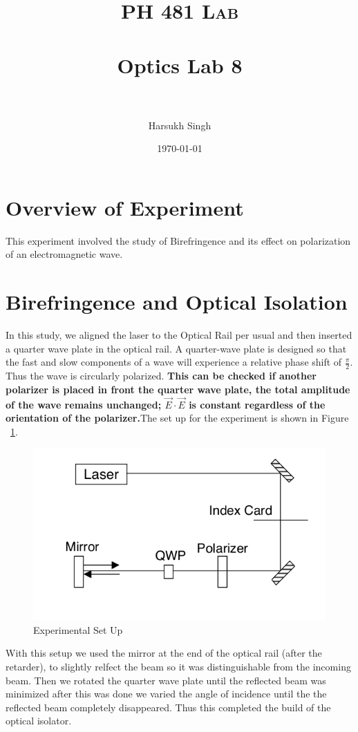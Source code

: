 \documentclass[paper=a4, fontsize=11pt]{scrartcl} %
\title{	
\normalfont \normalsize 
\textsc{PH 481 Lab} \\ [25pt] 
\horrule{2pt} \\[0.5cm] %
\huge Optics Lab 8\\ %
\horrule{2pt} \\[0.5cm] %
}
\author{Harsukh Singh} %
\date{\normalsize \today} %
\numberwithin{equation}{section}
\numberwithin{figure}{section}
\numberwithin{table}{section}
\begin{document}
\maketitle %
\section{Overview of Experiment}
This experiment involved the study of Birefringence and its effect on polarization of an electromagnetic wave.
\section{Birefringence and Optical Isolation}
 In this study, we aligned the laser to the Optical Rail per usual and then inserted a quarter wave plate in the optical rail. A quarter-wave plate is designed so that the fast and slow components of a wave will experience a relative phase shift of $\frac{\pi}{2}$. Thus the wave is circularly polarized. {\bfseries This can be checked if another polarizer is placed in front the quarter wave plate, the total amplitude of the wave remains unchanged; $\vec{E} \cdot \vec{E}$ is constant regardless of the orientation of the polarizer.}The set up for the experiment is  shown in Figure ~\ref{fig:stage}. 
 
\begin{figure}[H]
\centering
\includegraphics[scale =0.4]{stage}
\caption{Experimental Set Up}
\label{fig:stage}
\end{figure}

With this setup we used the mirror at the end of the optical rail (after the retarder), to slightly relfect the beam so it was distinguishable from the incoming beam. Then we rotated the quarter wave plate until the reflected beam was minimized after this was done we varied the angle of incidence until the the reflected beam completely disappeared. Thus this completed the build of the optical isolator. \\
\end{document}
